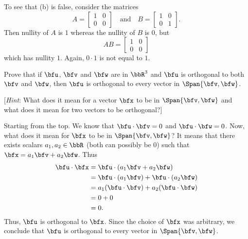 \begin{questions}
\begin{solution}
    To see that (b) is false, consider the matrices
    \[
      A=\begin{bmatrix}%
        1&0\\0&0
      \end{bmatrix}\quad\text{and}\quad%
      B=\begin{bmatrix}%
        1&0\\0&1
      \end{bmatrix}.
    \]
    Then nullity of $A$ is $1$ whereas the nullity of $B$ is $0$, but
    \[
      AB=\begin{bmatrix}%
        1&0\\0&0
      \end{bmatrix}
    \]
    which has nullity $1$. Again, $0\cdot 1$ is not equal to $1$.

  \end{solution}
  \question[8] Prove that if $\bfu$, $\bfv$ and $\bfw$ are in $\bbR^3$ and
  $\bfu$ is orthogonal to both $\bfv$ and $\bfw$, then $\bfu$ is orthogonal
  to every vector in $\Span\{\bfv,\bfw\}$.

  [\emph{Hint}: What does it mean for a vector $\bfx$ to be in
  $\Span\{\bfv,\bfw\}$ and what does it mean for two vectors to be
  orthogonal?]
  \begin{solution}
    Starting from the top. We know that $\bfu\cdot\bfv=0$ and
    $\bfu\cdot\bfw=0$. Now, what does it mean for $\bfx$ to be in
    $\Span\{\bfv,\bfw\}$? It means that there exists scalars
    $a_1,a_2\in\bbR$ (both can possibly be $0$) such that
    $\bfx=a_1\bfv+a_2\bfw$. Thus
    \begin{align*}
      \bfu\cdot\bfx&=\bfu\cdot(a_1\bfv+a_2\bfw)\\
                   &=\bfu\cdot (a_1\bfv)+\bfu\cdot(a_2\bfw)\\
                   &=a_1(\bfu\cdot\bfv)+a_2(\bfu\cdot\bfw)\\
                   &=0+0\\
                   &=0.
    \end{align*}
    Thus, $\bfu$ is orthogonal to $\bfx$. Since the choice of $\bfx$ was
    arbitrary, we conclude that $\bfu$ is orthogonal to every vector in
    $\Span\{\bfv,\bfw\}$.
  \end{solution}
\end{questions}

